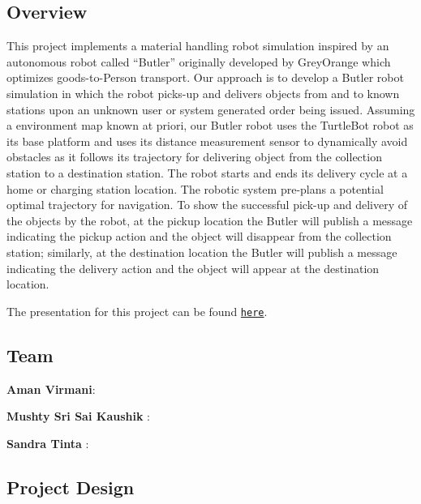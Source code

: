 \href{https://travis-ci.org/stinta/butler_gazebo}{\tt } \href{https://coveralls.io/github/stinta/butler_gazebo?branch=master}{\tt } \href{https://opensource.org/licenses/BSD-3-Clause}{\tt }

\subsection*{Overview}

This project implements a material handling robot simulation inspired by an autonomous robot called “\+Butler” originally developed by Grey\+Orange which optimizes goods-\/to-\/\+Person transport. Our approach is to develop a Butler robot simulation in which the robot picks-\/up and delivers objects from and to known stations upon an unknown user or system generated order being issued. Assuming a environment map known at priori, our Butler robot uses the Turtle\+Bot robot as its base platform and uses its distance measurement sensor to dynamically avoid obstacles as it follows its trajectory for delivering object from the collection station to a destination station. The robot starts and ends its delivery cycle at a home or charging station location. The robotic system pre-\/plans a potential optimal trajectory for navigation. To show the successful pick-\/up and delivery of the objects by the robot, at the pickup location the Butler will publish a message indicating the pickup action and the object will disappear from the collection station; similarly, at the destination location the Butler will publish a message indicating the delivery action and the object will appear at the destination location.

The presentation for this project can be found \href{.}{\tt here}.

\subsection*{Team}


\begin{DoxyItemize}
\item {\bfseries Aman Virmani}\+:
\item {\bfseries Mushty Sri Sai Kaushik} \+:
\item {\bfseries Sandra Tinta} \+:
\end{DoxyItemize}

\subsection*{Project Design}

